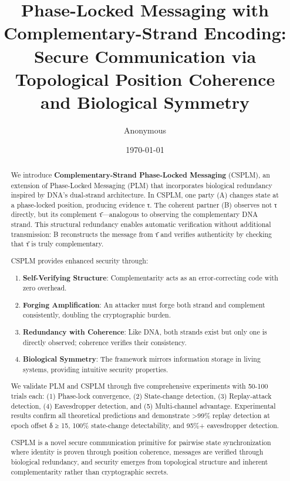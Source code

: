 \documentclass[11pt,a4paper]{article}
\title{\textbf{Phase-Locked Messaging with Complementary-Strand Encoding: \\ Secure Communication via Topological Position Coherence and Biological Symmetry}}
\author{Anonymous}
\date{\today}
\theoremstyle{definition}
\begin{document}
\maketitle

\begin{abstract}
We introduce \textbf{Complementary-Strand Phase-Locked Messaging} (CSPLM), an extension of Phase-Locked Messaging (PLM) that incorporates biological redundancy inspired by DNA's dual-strand architecture. In CSPLM, one party (A) changes state at a phase-locked position, producing evidence τ. The coherent partner (B) observes not τ directly, but its complement τ̄—analogous to observing the complementary DNA strand. This structural redundancy enables automatic verification without additional transmission: B reconstructs the message from τ̄ and verifies authenticity by checking that τ̄ is truly complementary.

CSPLM provides enhanced security through:
\begin{enumerate}
\item \textbf{Self-Verifying Structure}: Complementarity acts as an error-correcting code with zero overhead.
\item \textbf{Forging Amplification}: An attacker must forge both strand and complement consistently, doubling the cryptographic burden.
\item \textbf{Redundancy with Coherence}: Like DNA, both strands exist but only one is directly observed; coherence verifies their consistency.
\item \textbf{Biological Symmetry}: The framework mirrors information storage in living systems, providing intuitive security properties.
\end{enumerate}

We validate PLM and CSPLM through five comprehensive experiments with 50-100 trials each: (1) Phase-lock convergence, (2) State-change detection, (3) Replay-attack detection, (4) Eavesdropper detection, and (5) Multi-channel advantage. Experimental results confirm all theoretical predictions and demonstrate >99\% replay detection at epoch offset δ ≥ 15, 100\% state-change detectability, and 95\%+ eavesdropper detection.

CSPLM is a novel secure communication primitive for pairwise state synchronization where identity is proven through position coherence, messages are verified through biological redundancy, and security emerges from topological structure and inherent complementarity rather than cryptographic secrets.

\end{abstract}
\end{document}
